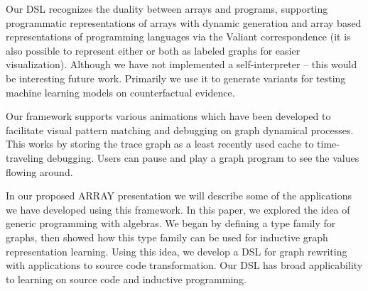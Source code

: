 \documentclass[sigplan,10pt,review,anonymous]{acmart}
\begin{document}
Our DSL recognizes the duality between arrays and programs, supporting programmatic representations of arrays with dynamic generation and array based representations of programming languages via the Valiant correspondence (it is also possible to represent either or both as labeled graphs for easier visualization). Although we have not implemented a self-interpreter -- this would be interesting future work. Primarily we use it to generate variants for testing machine learning models on counterfactual evidence.

Our framework supports various animations which have been developed to facilitate visual pattern matching and debugging on graph dynamical processes. This works by storing the trace graph as a least recently used cache to time-traveling debugging. Users can pause and play a graph program to see the values flowing around.

In our proposed ARRAY presentation we will describe some of the applications we have developed using this framework. In this paper, we explored the idea of generic programming with algebras. We began by defining a type family for graphs, then showed how this type family can be used for inductive graph representation learning. Using this idea, we develop a DSL for graph rewriting with applications to source code transformation. Our DSL has broad applicability to learning on source code and inductive programming.








%
%
%
%
%
%
\end{document}
